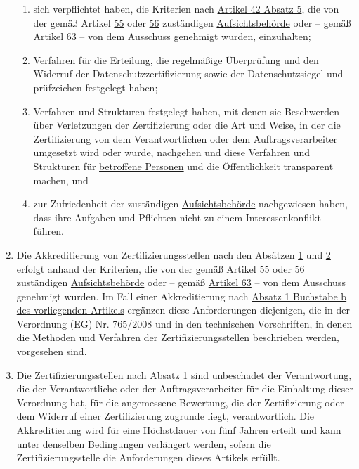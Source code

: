 \begin{enumerate}
\begin{enumerate}
    \item sich verpflichtet haben, die Kriterien nach \hyperref[itm:42-5]{Artikel 42 Absatz 5}, die von der gemäß
     Artikel \hyperref[ch:55]{55} oder \hyperref[ch:56]{56} zuständigen \hyperref[itm:04-21]{Aufsichtsbehörde} oder -- gemäß \hyperref[ch:63]
     {Artikel 63} -- von dem Ausschuss genehmigt wurden, einzuhalten;
    \label{itm:43-2b}

    \item Verfahren für die Erteilung, die regelmäßige Überprüfung und den Widerruf der Datenschutzzertifizierung sowie
     der Datenschutzsiegel und -prüfzeichen festgelegt haben;
    \label{itm:43-2c}

    \item Verfahren und Strukturen festgelegt haben, mit denen sie Beschwerden über Verletzungen der Zertifizierung oder
     die Art und Weise, in der die Zertifizierung von dem Verantwortlichen oder dem Auftragsverarbeiter umgesetzt wird
     oder wurde, nachgehen und diese Verfahren und Strukturen für \hyperref[itm:04-1]{betroffene Personen} und die Öffentlichkeit
     transparent machen, und
    \label{itm:43-2d}

    \item zur Zufriedenheit der zuständigen \hyperref[itm:04-21]{Aufsichtsbehörde} nachgewiesen haben, dass ihre Aufgaben und Pflichten nicht
     zu einem Interessenkonflikt führen.
    \label{itm:43-2e}

  \end{enumerate}

  \item Die Akkreditierung von Zertifizierungsstellen nach den Absätzen \hyperref[itm:43-1]{1} und \hyperref[itm:43-2]
   {2} erfolgt anhand der Kriterien, die von der gemäß Artikel \hyperref[ch:55]{55} oder \hyperref[ch:56]
   {56} zuständigen \hyperref[itm:04-21]{Aufsichtsbehörde} oder -- gemäß \hyperref[ch:63]{Artikel 63} -- von dem Ausschuss genehmigt wurden.
   Im Fall einer Akkreditierung nach \hyperref[itm:43-1b]{Absatz 1 Buchstabe b des vorliegenden Artikels} ergänzen
   diese Anforderungen diejenigen, die in der Verordnung (EG) Nr. 765/2008 und in den
   technischen Vorschriften, in denen die Methoden und Verfahren der Zertifizierungsstellen beschrieben werden,
   vorgesehen sind.
  \label{itm:43-3}

  \item Die Zertifizierungsstellen nach \hyperref[itm:43-1]{Absatz 1} sind unbeschadet der Verantwortung, die der
   Verantwortliche oder der Auftragsverarbeiter für die Einhaltung dieser Verordnung hat, für die angemessene
   Bewertung, die der Zertifizierung oder dem Widerruf einer Zertifizierung zugrunde liegt, verantwortlich. Die
   Akkreditierung wird für eine Höchstdauer von fünf Jahren erteilt und kann unter denselben Bedingungen verlängert
   werden, sofern die Zertifizierungsstelle die Anforderungen dieses Artikels erfüllt.
  \label{itm:43-4}


\end{enumerate}

